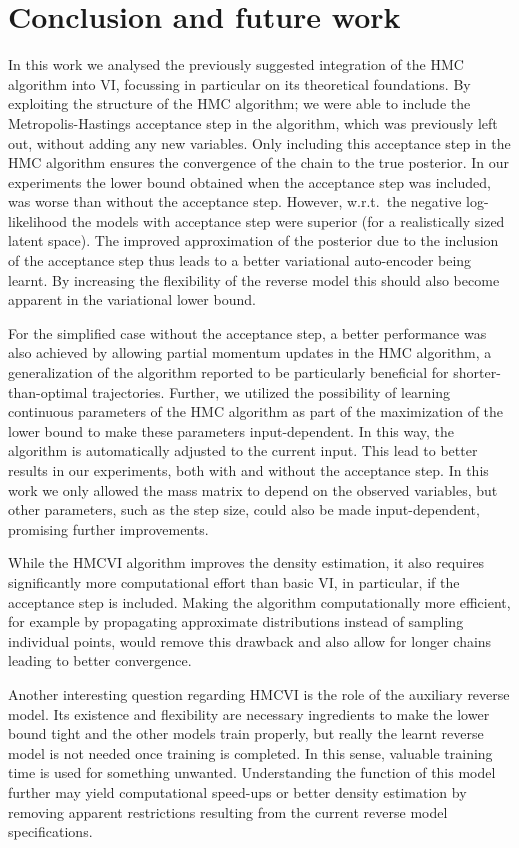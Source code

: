 \section{Conclusion and future work}
\label{sec:ConclAndFuture}
In this work we analysed the previously suggested integration of the HMC algorithm into VI, focussing in particular on its theoretical foundations. By exploiting the structure of the HMC algorithm; we were able to include the Metropolis-Hastings acceptance step in the algorithm, which was previously left out, without adding any new variables. Only including this acceptance step in the HMC algorithm ensures the convergence of the chain to the true posterior. In our experiments the lower bound obtained when the acceptance step was included, was worse than without the acceptance step. However, w.r.t.\ the negative log-likelihood the models with acceptance step were superior (for a realistically sized latent space). The improved approximation of the posterior due to the inclusion of the acceptance step thus leads to a better variational auto-encoder being learnt. By increasing the flexibility of the reverse model this should also become apparent in the variational lower bound.

For the simplified case without the acceptance step, a better performance was also achieved by allowing partial momentum updates in the HMC algorithm, a generalization of the algorithm reported to be particularly beneficial for shorter-than-optimal trajectories. Further, we utilized the possibility of learning continuous parameters of the HMC algorithm as part of the maximization of the lower bound to make these parameters input-dependent. In this way, the algorithm is automatically adjusted to the current input. This lead to better results in our experiments, both with and without the acceptance step. In this work we only allowed the mass matrix to depend on the observed variables, but other parameters, such as the step size, could also be made input-dependent, promising further improvements.

While the HMCVI algorithm improves the density estimation, it also requires significantly more computational effort than basic VI, in particular, if the acceptance step is included. Making the algorithm computationally more efficient, for example by propagating approximate distributions instead of sampling individual points, would remove this drawback and also allow for longer chains leading to better convergence.

Another interesting question regarding HMCVI is the role of the auxiliary reverse model. Its existence and flexibility are necessary ingredients to make the lower bound tight and the other models train properly, but really the learnt reverse model is not needed once training is completed. In this sense, valuable training time is used for something unwanted. Understanding the function of this model further may yield computational speed-ups or better density estimation by removing apparent restrictions resulting from the current reverse model specifications.